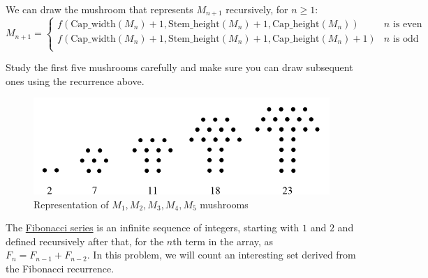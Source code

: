\documentclass[addpoints]{exam}
\begin{document}
\begin{questions}
We can draw the mushroom that represents $M_{n+1}$ recursively, for $n \geq 1$:
\[ 
    M_{n+1}=
    \begin{cases} 
      f(\textrm{Cap\_width}(M_n) + 1, \textrm{Stem\_height}(M_n) + 1, \textrm{Cap\_height}(M_n))  & n \textrm{ is even} \\
      f(\textrm{Cap\_width}(M_n) + 1, \textrm{Stem\_height}(M_n) + 1, \textrm{Cap\_height}(M_n)+1) & n \textrm{ is odd}  \\      
   \end{cases}
\]

Study the first five mushrooms carefully and make sure you can draw subsequent ones using the recurrence above.

\begin{figure}[h]
  \centering
  \includegraphics{mushroom_series.png}
  \caption{Representation of $M_1,M_2,M_3,M_4,M_5$ mushrooms}
  \label{fig:mushroom_anatomy}
\end{figure}


\question
    The \href{https://en.wikipedia.org/wiki/Fibonacci_number}{Fibonacci series} is an infinite sequence of integers, starting with $1$ and $2$ and defined recursively after that, for the $n$th term in the array, as $F_n = F_{n-1} + F_{n-2}$. In this problem, we will count an interesting set derived from the Fibonacci recurrence.
    

\end{questions}
\end{document}
